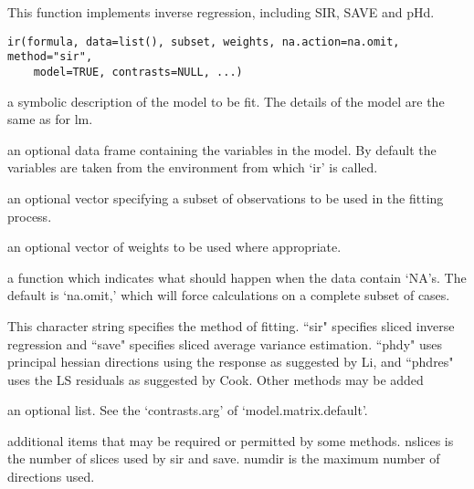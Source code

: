 \documentclass[letterpaper]{book}
\begin{document}
\begin{Description}\relax
This function implements inverse regression, including SIR, SAVE and pHd.\end{Description}
\begin{Usage}
\begin{verbatim}
ir(formula, data=list(), subset, weights, na.action=na.omit, method="sir", 
    model=TRUE, contrasts=NULL, ...)
\end{verbatim}
\end{Usage}
\begin{Arguments}
\begin{ldescription}
\item[\code{formula}] a symbolic description of the model to be fit. The details of
the model are the same as for lm. 
\item[\code{data}] an optional data frame containing the variables in the model.
By default the variables are taken from the environment from
which `ir' is called.
\item[\code{subset}] an optional vector specifying a subset of observations to be
used in the fitting process.
\item[\code{weights}] an optional vector of weights to be used where appropriate.
\item[\code{na.action}] a function which indicates what should happen when the data
contain `NA's.  The default is `na.omit,' which will force
calculations on a complete subset of cases.
\item[\code{method}] This character string specifies the method of fitting.  ``sir"
specifies sliced inverse regression and ``save" specifies sliced
average variance estimation.  ``phdy" uses principal hessian
directions using the response as suggested by Li, and ``phdres" 
uses the LS residuals as suggested by Cook. Other methods may be
added
\item[\code{contrasts}] an optional list. See the `contrasts.arg' of
`model.matrix.default'.
\item[\code{...}] additional items that may be required or permitted by some 
methods.
nslices is the number of slices used by sir and save.  numdir 
is the maximum number of directions used.
\end{ldescription}
\end{Arguments}
\end{document}
